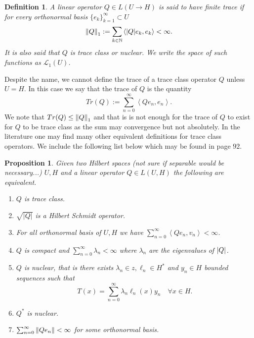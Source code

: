 \documentclass[12pt]{article}
\newcommand{\br}[1]{\left\langle#1\right\rangle}
\newcommand{\R}zzzzz
\newtheorem{proposition}{Proposition}
\newtheorem{definition}{Definition}
\begin{document}
\begin{definition}
	A linear operator $Q\in L(U\to H)$ is said to have finite trace if for every orthonormal basis $\{e_k\}_{k=1}^\infty \subset  U$
	\begin{equation*}
		\norm{Q}_1:=\sum_{k\in\mathbb{N}}\br{\abs{Q}e_k,e_k}<\infty.
	\end{equation*}
	It is also said that $Q$ is trace class or nuclear. We write the space of such functions as $\mathcal{L}_1(U)$.
\end{definition}
Despite the name, we cannot define the trace of a trace class operator $Q$ unless  $U=H$. In this case we say that the trace of $Q$ is the quantity
\begin{equation*}
	Tr(Q):=\sum_{n=0}^{\infty} \br{Q e_n,e_n}.
\end{equation*}
We note that $Tr(Q)\leq \norm{Q}_1$ and that is is not enough for the trace of $Q$ to exist for $Q$ to be trace class as the sum may convergence but not absolutely. In the literature one may find many other equivalent definitions for trace class operators. We include the following list below which may be found in \cite{lototsky2017stochastic} page $92$.
\begin{proposition} Given two Hilbert spaces (not sure if separable would be necessary...) $U,H$ and a linear operator  $Q\in L(U,H)$ the following are equivalent.
	\begin{enumerate}
		\item $Q$ is trace class.
		\item $\sqrt{|Q|} $ is a Hilbert Schmidt operator.
		\item For all orthonormal basis of $U,H$ we have $\sum_{n=0}^{\infty} \br{Qe_n,v_n}<\infty$.
		\item $Q$ is compact and  $\sum_{n=0}^{\infty} \lambda _n<\infty$ where $\lambda _n$ are the eigenvalues of $\abs{Q}$.
		\item $Q$ is nuclear, that is there exists  $\lambda _n \in \R,\ell_n \in H^*$ and $y_n \in H$ bounded sequences such that
		      \begin{equation*}
			      T(x)=\sum_{n=0}^{\infty} \lambda _n\ell_n(x)y_n \quad\forall x\in H.
		      \end{equation*}
		\item $Q^*$ is nuclear.
		\item $\sum_{n=0}^{\infty} \norm{Qe_n}<\infty$ for some orthonormal basis.

	\end{enumerate}
\end{proposition}
\end{document}
